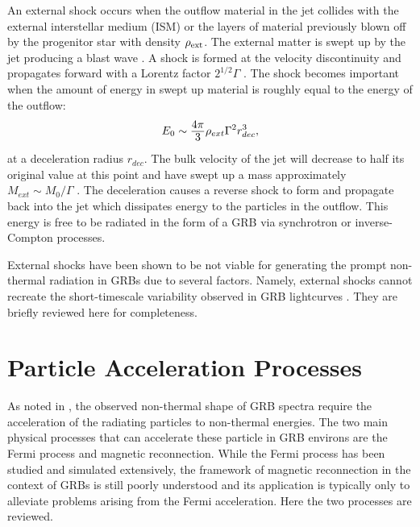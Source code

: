An external shock occurs when the outflow material in the jet collides
with the external interstellar medium (ISM) or the layers of material
previously blown off by the progenitor star with density $\rho_{\rm
  ext}$. The external matter is swept up by the jet producing a blast
wave \cite{Rees:1992}. A shock is formed at the velocity discontinuity
and propagates forward with a Lorentz factor $2^{1/2} \Gamma$
\cite{Blandford:1976}.  The shock becomes important when the amount of
energy in swept up material is roughly equal to the energy of the
outflow:
\begin{equation}
  \label{eq:extShockE}
  E_0 \sim \dover{4 \pi}{3} \rho_{ext} \Gamma^2 r_{dec}^3,
\end{equation}
at a deceleration radius $r_{dec}$. The bulk velocity of the jet will
decrease to half its original value at this point and have swept up a
mass approximately $M_{ext}\sim M_0/\Gamma$ \cite{Rees:1992}. The
deceleration causes a reverse shock to form and propagate back into
the jet which dissipates energy to the particles in the outflow. This energy
is free to be radiated in the form of a GRB via synchrotron or
inverse-Compton processes.

External shocks have been shown to be not viable for generating the
prompt non-thermal radiation in GRBs due to several factors. Namely,
external shocks cannot recreate the short-timescale variability
observed in GRB lightcurves \cite{Sari:1997}. They are briefly
reviewed here for completeness.




\section{Particle Acceleration Processes}
As noted in , the observed non-thermal shape of
GRB spectra require the acceleration of the radiating particles to
non-thermal energies. The two main physical processes that can
accelerate these particle in GRB environs are the Fermi process and
magnetic reconnection.  While the Fermi process has been studied and
simulated extensively, the framework of magnetic reconnection in the
context of GRBs is still poorly understood and its application is
typically only to alleviate problems arising from the Fermi
acceleration. Here the two processes are reviewed.
  


